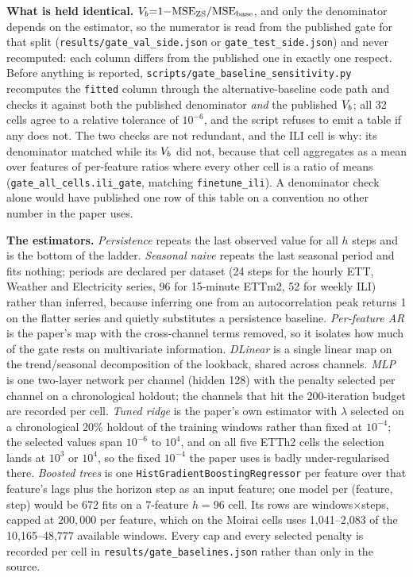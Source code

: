 \textbf{What is held identical.}  $V_{b}{=}1{-}\text{MSE}_\text{ZS} /
\text{MSE}_\text{base}$, and only the denominator depends on the estimator, so
the numerator is read from the published gate for that split
(\texttt{results/gate\_val\_side.json} or \texttt{gate\_test\_side.json}) and never
recomputed: each column differs from the published one in exactly one respect.
Before anything is reported, \texttt{scripts/gate\_baseline\_sensitivity.py}
recomputes the \texttt{fitted} column through the alternative-baseline code path
and checks it against both the published denominator \emph{and} the published
$V_{b}$; all 32 cells agree to a relative tolerance of $10^{-6}$, and
the script refuses to emit a table if any does not.  The two checks are not
redundant, and the ILI cell is why: its denominator matched while its
$V_{b}$ did not, because that cell aggregates as a mean over features
of per-feature ratios where every other cell is a ratio of means
(\texttt{gate\_all\_cells.ili\_gate}, matching \texttt{finetune\_ili}).  A
denominator check alone would have published one row of this table on a
convention no other number in the paper uses.

\textbf{The estimators.}  \emph{Persistence} repeats the last observed value for
all $h$ steps and is the bottom of the ladder.  \emph{Seasonal naive} repeats the
last seasonal period
and fits nothing; periods are declared per dataset (24 steps for the hourly ETT,
Weather and Electricity series, 96 for 15-minute ETTm2, 52 for weekly ILI) rather
than inferred, because inferring one from an autocorrelation peak returns 1 on
the flatter series and quietly substitutes a persistence baseline.
\emph{Per-feature AR} is the paper's map with the cross-channel terms removed, so
it isolates how much of the gate rests on multivariate information.
\emph{DLinear} is a single linear map on the trend/seasonal decomposition of the
lookback, shared across channels.  \emph{MLP} is one two-layer network per channel
(hidden 128) with the penalty selected per channel on a chronological holdout;
the channels that hit the 200-iteration budget are recorded per cell.  \emph{Tuned
ridge} is the paper's own estimator with $\lambda$ selected on a chronological
20\% holdout of the training windows rather than fixed at $10^{-4}$; the selected
values span $10^{-6}$ to $10^{4}$, and on all five ETTh2 cells the selection lands
at $10^{3}$ or $10^{4}$, so the fixed $10^{-4}$ the paper uses is badly
under-regularised there.  \emph{Boosted trees} is one
\texttt{HistGradientBoostingRegressor} per feature over that feature's lags plus
the horizon step as an input feature; one model per (feature, step) would be 672
fits on a 7-feature $h{=}96$ cell.  Its rows are windows${\times}$steps, capped at
$200{,}000$ per feature, which on the Moirai cells uses 1{,}041--2{,}083 of the
10{,}165--48{,}777 available windows.  Every cap and every selected penalty is
recorded per cell in \texttt{results/gate\_baselines.json} rather than only in the
source.

